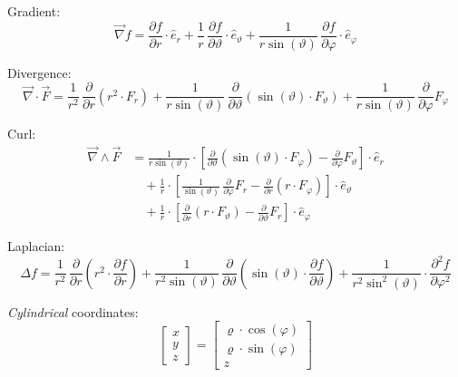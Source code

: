 \documentclass[fontsize=11pt,a4paper]{scrartcl}
\begin{document}
Gradient:
\[
	\vec\nabla f = \frac{\partial f}{\partial r}\cdot\hat e_r + \frac{1}{r}\,\frac{\partial f}{\partial \vartheta}\cdot\hat e_\vartheta
	               + \frac{1}{r\sin(\vartheta)}\,\frac{\partial f}{\partial\varphi}\cdot\hat e_\varphi
\]

Divergence:
\[
	\vec\nabla\cdot\vec F = \frac{1}{r^2}\,\frac{\partial}{\partial r}(r^2\cdot F_r)
	                        + \frac{1}{r\sin(\vartheta)}\,\frac{\partial}{\partial\vartheta}\left(\sin(\vartheta)\cdot F_\vartheta\right)
	                        + \frac{1}{r\sin(\vartheta)}\,\frac{\partial}{\partial\varphi} F_\varphi
\]

Curl:
\begin{equation*}
\begin{split}
	\vec\nabla\wedge\vec F &= \frac{1}{r\sin(\vartheta)}\cdot\left[\frac{\partial}{\partial\vartheta}\left(\sin(\vartheta)\cdot F_\varphi\right)
	                    - \frac{\partial}{\partial\varphi}F_\vartheta\right]\cdot\hat e_r\\
	                 &\quad +\frac{1}{r}\cdot\left[\frac{1}{\sin(\vartheta)}\,\frac{\partial}{\partial\varphi}F_r
	                    - \frac{\partial}{\partial r}(r\cdot F_\varphi)\right]\cdot\hat e_\vartheta\\
	                 &\quad +\frac{1}{r}\cdot\left[\frac{\partial}{\partial r}(r\cdot F_\vartheta)-\frac{\partial}{\partial\vartheta}F_r\right]\cdot\hat e_\varphi
\end{split}
\end{equation*}

Laplacian:
\begin{equation*}
	\Delta f = \frac{1}{r^2}\,\frac{\partial}{\partial r}\left(r^2\cdot\frac{\partial f}{\partial r}\right)
	           + \frac{1}{r^2\sin(\vartheta)}\,\frac{\partial}{\partial\vartheta}\left(\sin(\vartheta)\cdot\frac{\partial f}{\partial\vartheta}\right)
	           + \frac{1}{r^2\sin^2(\vartheta)}\cdot\frac{\partial^2 f}{\partial\varphi^2}
\end{equation*}

\emph{Cylindrical} coordinates:
\[
	\begin{bmatrix}x\\ y\\ z\end{bmatrix} =
	\begin{bmatrix}\varrho\cdot\cos(\varphi)\\ \varrho\cdot\sin(\varphi)\\ z\end{bmatrix}
\]
\end{document}
